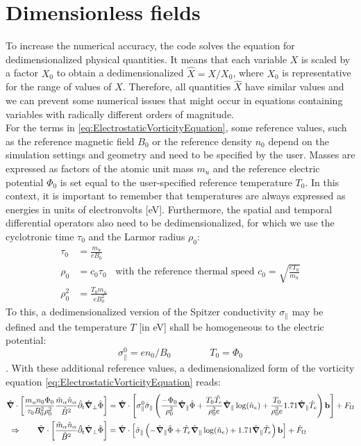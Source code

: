 \section{Dimensionless fields}
\label{sec:DedimensionalizedElectromagneticModelS3X}

To increase the numerical accuracy, the code solves the equation for dedimensionalized physical quantities. It means that each variable $X$ is scaled by a factor $X_0$ to obtain a dedimensionalized $\hat{X} = X/X_0$, where $X_0$ is representative for the range of values of $X$. Therefore, all quantities $\hat{X}$ have similar values and we can prevent some numerical issues that might occur in equations containing variables with radically different orders of magnitude. \\


For the terms in \autoref{eq:ElectrostaticVorticityEquation}, some reference values, such as the reference magnetic field $B_0$ or the reference density $n_0$ depend on the simulation settings and geometry and need to be specified by the user. Masses are expressed as factors of the atomic unit mass $m_u$ and the reference electric potential $\Phi_0$ is set equal to the user-specified reference temperature $T_0$. In this context, it is important to remember that temperatures are always expressed as energies in units of electronvolts [eV]. Furthermore, the spatial and temporal differential operators also need to be dedimensionalized, for which we use the cyclotronic time $\tau_0$ and the Larmor radius $\rho_0$:
\begin{align}
	\tau_0 &= \frac{m_u}{eB_0} \nonumber \\
	\rho_0 &= c_0 \tau_0 & \text{with the reference thermal speed } c_0 = \sqrt{\frac{eT_0}{m_u}} \nonumber \\
	\rho_0^2 &= \frac{T_0m_u}{eB_0^2} \nonumber
\end{align}
To this, a dedimensionalized version of the Spitzer conductivity $\sigma_\parallel$ may be defined and the temperature $T$ [in eV] shall be homogeneous to the electric potential: $$ \sigma_\parallel^0 = en_0 / B_0 \qquad\qquad T_0 =\Phi_0$$.
With these additional reference values, a dedimensionalized form of the vorticity equation \ref{eq:ElectrostaticVorticityEquation} reads:
\begin{align}
	\hat{\grad}\cdot\left[\frac{m_un_0\Phi_0}{\tau_0B_0^2\rho_0^2}\frac{\hat{m}_\alpha \hat{n}_\alpha}{ \hat{B}^2}\hat{\partial}_t\hat{\grad}_\perp\hat{\Phi}\right] 
	&= \hat{\grad}\cdot\left[\sigma_\parallel^0\hat{\sigma}_\parallel\left(\frac{-\Phi_0}{\rho_0^2}\hat{\grad}_\parallel\hat{\Phi}
	+ \frac{T_0\hat{T_e}}{\rho_0^2e}\hat{\grad}_\parallel\log(\hat{n}_e)
	+ \frac{T_0}{\rho_0^2e}1.71\hat{\grad}_\parallel \hat{T}_e \right)\mathbf{b}\right] + F_\Omega \nonumber \\
	\Rightarrow \qquad\hat{\grad}\cdot\left[\frac{\hat{m}_\alpha \hat{n}_\alpha}{ \hat{B}^2}\hat{\partial}_t\hat{\grad}_\perp\hat{\Phi}\right]
	&= \hat{\grad}\cdot\left[\hat{\sigma}_\parallel\left(
	- \hat{\grad}_\parallel\hat{\Phi}
	+ \hat{T}_e\hat{\grad}_\parallel\log(\hat{n}_e)
	+ 1.71\hat{\grad}_\parallel \hat{T}_e \right)\mathbf{b}\right] + \hat{F}_\Omega
	\label{eq:ElectrostaticVorticityEquation_dedimensionalized}
\end{align}
